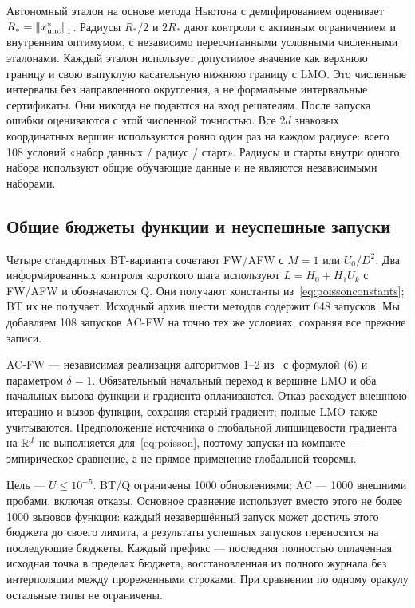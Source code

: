 
Автономный эталон на основе метода Ньютона с демпфированием оценивает
$R_*=\left\|x^*_{\rm unc}\right\|_1$. Радиусы $R_*/2$ и $2R_*$ дают
контроли с активным ограничением и внутренним оптимумом, с независимо
пересчитанными условными численными эталонами. Каждый эталон использует
допустимое значение как верхнюю границу и свою выпуклую касательную
нижнюю границу с LMO. Это численные интервалы без направленного
округления, а не формальные интервальные сертификаты. Они никогда не
подаются на вход решателям. После запуска ошибки оцениваются с этой
численной точностью. Все $2d$ знаковых координатных вершин используются
ровно один раз на каждом радиусе: всего 108 условий «набор данных /
радиус / старт». Радиусы и старты внутри одного набора используют
общие обучающие данные и не являются независимыми наборами.

\subsection{Общие бюджеты функции и неуспешные запуски}
Четыре стандартных BT-варианта сочетают FW/AFW с $M=1$ или
$U_0/D^2$. Два информированных контроля короткого шага используют
$L=H_0+H_1U_k$ с FW/AFW и обозначаются Q. Они получают константы
из~\eqref{eq:poissonconstants}; BT их не получает. Исходный архив
шести методов содержит 648 запусков. Мы добавляем 108 запусков AC-FW
на точно тех же условиях, сохраняя все прежние записи.

AC-FW — независимая реализация алгоритмов 1--2
из~\cite{autoconditioned} с формулой (6) и параметром $\delta=1$.
Обязательный начальный переход к вершине LMO и оба начальных вызова
функции и градиента оплачиваются. Отказ расходует внешнюю итерацию и
вызов функции, сохраняя старый градиент; полные LMO также учитываются.
Предположение источника о глобальной липшицевости градиента на $\mathbb R^d$
не выполняется для~\eqref{eq:poisson}, поэтому запуски на компакте —
эмпирическое сравнение, а не прямое применение глобальной теоремы.

Цель — $U\le10^{-5}$. BT/Q ограничены 1000 обновлениями; AC —
1000 внешними пробами, включая отказы. Основное сравнение использует
вместо этого не более 1000 вызовов функции: каждый незавершённый
запуск может достичь этого бюджета до своего лимита, а результаты
успешных запусков переносятся на последующие бюджеты. Каждый префикс —
последняя полностью оплаченная исходная точка в пределах бюджета,
восстановленная из полного журнала без интерполяции между прореженными
строками. При сравнении по одному оракулу остальные типы не ограничены.

